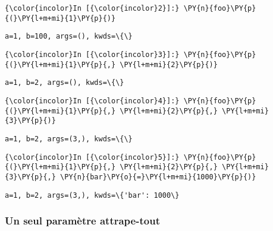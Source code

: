     \begin{Verbatim}[commandchars=\\\{\}]
{\color{incolor}In [{\color{incolor}2}]:} \PY{n}{foo}\PY{p}{(}\PY{l+m+mi}{1}\PY{p}{)}
\end{Verbatim}


    \begin{Verbatim}[commandchars=\\\{\}]
a=1, b=100, args=(), kwds=\{\}

    \end{Verbatim}

    \begin{Verbatim}[commandchars=\\\{\}]
{\color{incolor}In [{\color{incolor}3}]:} \PY{n}{foo}\PY{p}{(}\PY{l+m+mi}{1}\PY{p}{,} \PY{l+m+mi}{2}\PY{p}{)}
\end{Verbatim}


    \begin{Verbatim}[commandchars=\\\{\}]
a=1, b=2, args=(), kwds=\{\}

    \end{Verbatim}

    \begin{Verbatim}[commandchars=\\\{\}]
{\color{incolor}In [{\color{incolor}4}]:} \PY{n}{foo}\PY{p}{(}\PY{l+m+mi}{1}\PY{p}{,} \PY{l+m+mi}{2}\PY{p}{,} \PY{l+m+mi}{3}\PY{p}{)}
\end{Verbatim}


    \begin{Verbatim}[commandchars=\\\{\}]
a=1, b=2, args=(3,), kwds=\{\}

    \end{Verbatim}

    \begin{Verbatim}[commandchars=\\\{\}]
{\color{incolor}In [{\color{incolor}5}]:} \PY{n}{foo}\PY{p}{(}\PY{l+m+mi}{1}\PY{p}{,} \PY{l+m+mi}{2}\PY{p}{,} \PY{l+m+mi}{3}\PY{p}{,} \PY{n}{bar}\PY{o}{=}\PY{l+m+mi}{1000}\PY{p}{)}
\end{Verbatim}


    \begin{Verbatim}[commandchars=\\\{\}]
a=1, b=2, args=(3,), kwds=\{'bar': 1000\}

    \end{Verbatim}

    \hypertarget{un-seul-paramuxe8tre-attrape-tout}{%
\subsubsection{Un seul paramètre
attrape-tout}\label{un-seul-paramuxe8tre-attrape-tout}}

